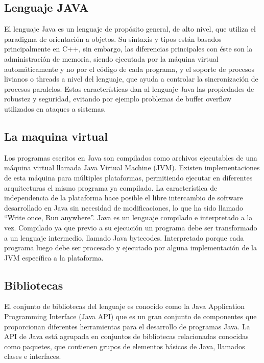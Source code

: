 \subsection{Lenguaje JAVA}

El lenguaje Java es un lenguaje de propósito general, de alto nivel, que utiliza el paradigma de orientación a objetos. Su sintaxis y tipos están basados principalmente en C++, sin embargo, las diferencias principales con éste son la administración de memoria, siendo ejecutada por la máquina virtual automáticamente y no por el código de cada programa, y el soporte de procesos livianos o threads a nivel del lenguaje, que ayuda a controlar la sincronización de procesos paralelos. Estas características dan al lenguaje Java las propiedades de robustez y seguridad, evitando por ejemplo problemas de buffer overflow utilizados en ataques a sistemas. \cite[pág. 5]{nunez2003investigacion}

\subsection{La maquina virtual}

Los programas escritos en Java son compilados como archivos ejecutables de una máquina virtual llamada Java Virtual Machine (JVM). Existen implementaciones de esta máquina para múltiples plataformas, permitiendo ejecutar en diferentes arquitecturas el mismo programa ya compilado. La característica de independencia de la plataforma hace posible el libre intercambio de software desarrollado en Java sin necesidad de modificaciones, lo que ha sido llamado “Write once, Run anywhere”. \cite{deepak2001core}
Java es un lenguaje compilado e interpretado a la vez. Compilado ya que previo a su ejecución un programa debe ser transformado a un lenguaje intermedio, llamado Java bytecodes. Interpretado porque cada programa luego debe ser procesado y ejecutado por alguna implementación de la JVM específica a la plataforma. \cite[pág. 6]{nunez2003investigacion}

\subsection{Bibliotecas}

El conjunto de bibliotecas del lenguaje es conocido como la Java Application Programming Interface (Java API) que es un gran conjunto de componentes que proporcionan diferentes herramientas para el desarrollo de programas Java. La API de Java está agrupada en conjuntos de bibliotecas relacionadas conocidas como paquetes, que contienen grupos de elementos básicos de Java, llamados clases e interfaces. \cite[pág. 6]{nunez2003investigacion}


